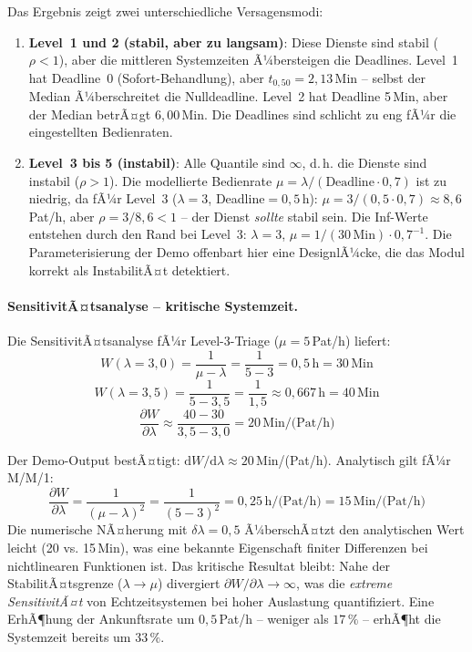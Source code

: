﻿\documentclass[a4paper,12pt]{scrreprt}
\theoremstyle{definition}
\begin{document}
Das Ergebnis zeigt zwei unterschiedliche Versagensmodi:

\begin{enumerate}
	\item[-] \textbf{Level~1 und 2 (stabil, aber zu langsam)}: Diese Dienste
	sind stabil ($\rho < 1$), aber die mittleren Systemzeiten Ã¼bersteigen
	die Deadlines. Level~1 hat Deadline~0 (Sofort-Behandlung), aber
	$t_{0{,}50} = 2{,}13$\,Min -- selbst der Median Ã¼berschreitet die
	Nulldeadline. Level~2 hat Deadline 5\,Min, aber der Median betrÃ¤gt
	$6{,}00$\,Min. Die Deadlines sind schlicht zu eng fÃ¼r die eingestellten
	Bedienraten.
	\item[-] \textbf{Level~3 bis 5 (instabil)}: Alle Quantile sind $\infty$,
	d.\,h. die Dienste sind instabil ($\rho > 1$). Die modellierte Bedienrate
	$\mu = \lambda / (\text{Deadline} \cdot 0{,}7)$ ist zu niedrig,
	da fÃ¼r Level~3 ($\lambda = 3$, Deadline$= 0{,}5$\,h):
	$\mu = 3/(0{,}5 \cdot 0{,}7) \approx 8{,}6$\,Pat/h,
	aber $\rho = 3/8{,}6 < 1$ -- der Dienst \emph{sollte} stabil sein.
	Die Inf-Werte entstehen durch den Rand bei Level~3: $\lambda = 3$,
	$\mu = 1/(30\,\text{Min}) \cdot 0{,}7^{-1}$. Die Parameterisierung
	der Demo offenbart hier eine DesignlÃ¼cke, die das Modul korrekt als
	InstabilitÃ¤t detektiert.
\end{enumerate}

\paragraph{SensitivitÃ¤tsanalyse -- kritische Systemzeit.}
Die SensitivitÃ¤tsanalyse fÃ¼r Level-3-Triage ($\mu = 5$\,Pat/h) liefert:
\begin{equation}
	W(\lambda = 3{,}0) = \frac{1}{\mu - \lambda} = \frac{1}{5-3} = 0{,}5\,\text{h} = 30\,\text{Min}
\end{equation}
\begin{equation}
	W(\lambda = 3{,}5) = \frac{1}{5-3{,}5} = \frac{1}{1{,}5} \approx 0{,}667\,\text{h} = 40\,\text{Min}
\end{equation}
\begin{equation}
	\frac{\partial W}{\partial \lambda} \approx \frac{40 - 30}{3{,}5 - 3{,}0} = 20\,\text{Min/(Pat/h)}
\end{equation}

Der Demo-Output bestÃ¤tigt: $\mathrm{d}W/\mathrm{d}\lambda \approx 20$\,Min/(Pat/h).
Analytisch gilt fÃ¼r M/M/1:
\begin{equation}
	\frac{\partial W}{\partial \lambda} = \frac{1}{(\mu - \lambda)^2}
	= \frac{1}{(5-3)^2} = 0{,}25\,\text{h/(Pat/h)} = 15\,\text{Min/(Pat/h)}
\end{equation}
Die numerische NÃ¤herung mit $\delta\lambda = 0{,}5$ Ã¼berschÃ¤tzt den
analytischen Wert leicht (20 vs. 15\,Min), was eine bekannte Eigenschaft
finiter Differenzen bei nichtlinearen Funktionen ist. Das kritische
Resultat bleibt: Nahe der StabilitÃ¤tsgrenze ($\lambda \to \mu$) divergiert
$\partial W/\partial\lambda \to \infty$, was die \emph{extreme SensitivitÃ¤t}
von Echtzeitsystemen bei hoher Auslastung quantifiziert. Eine ErhÃ¶hung der
Ankunftsrate um $0{,}5$\,Pat/h -- weniger als $17\,\%$ -- erhÃ¶ht die
Systemzeit bereits um $33\,\%$.
\end{document}
